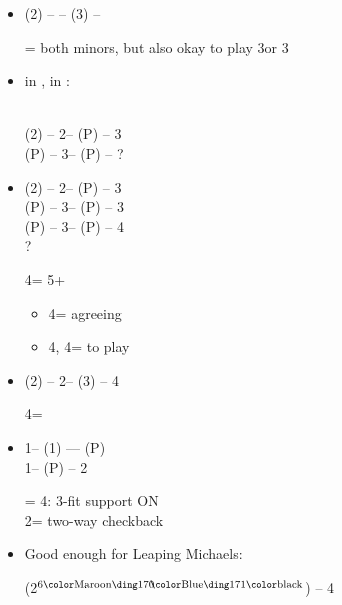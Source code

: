 \documentclass[12pt, a4paper]{article}
\begin{document}
\begin{itemize}
\item (2\spades) -- \dbl -- (3\spades) -- \dbl

\dbl = both minors, but also okay to play 3\spades\dbl or 3\nt

\item \gf in , \soff in :

 \\
(2\spades) -- 2\nt -- (P) -- 3\diams \\
(P) -- 3\hearts -- (P) -- ?

\item
(2\spades) -- 2\nt -- (P) -- 3\clubs \\
(P) -- 3\diams -- (P) -- 3\spades \\
(P) -- 3\nt -- (P) -- 4\clubs \\
?

4\clubs = 5+\clubs
\begin{itemize}
    \item 4\diams = agreeing \clubs
    \item 4\hearts, 4\nt = to play
\end{itemize}

\item 
(2\hearts) -- 2\nt -- (3\hearts) -- 4\hearts 

4\hearts = \trsf{\spades}

\item 
1\clubs -- (1\spades) --\dbl -- (P) \\
1\nt -- (P) -- 2\diams

\dbl = 4\hearts: 3-fit support ON\\
2\diams = two-way checkback

\item Good enough for Leaping Michaels:\\

(2\diams$^\text{6\major}$) -- 4\clubs



\end{itemize}
\end{document}
